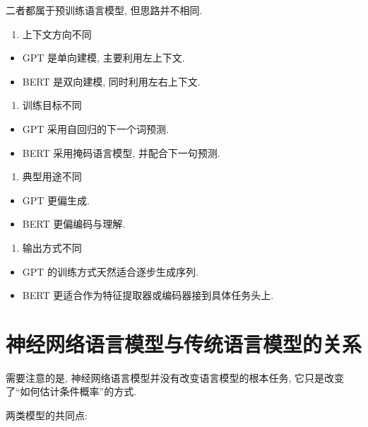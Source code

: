二者都属于预训练语言模型, 但思路并不相同.

\begin{enumerate}
\item[1.] 上下文方向不同
\end{enumerate}

\begin{itemize}
\item GPT 是单向建模, 主要利用左上下文.
\item BERT 是双向建模, 同时利用左右上下文.
\end{itemize}

\begin{enumerate}
\item[2.] 训练目标不同
\end{enumerate}

\begin{itemize}
\item GPT 采用自回归的下一个词预测.
\item BERT 采用掩码语言模型, 并配合下一句预测.
\end{itemize}

\begin{enumerate}
\item[3.] 典型用途不同
\end{enumerate}

\begin{itemize}
\item GPT 更偏生成.
\item BERT 更偏编码与理解.
\end{itemize}

\begin{enumerate}
\item[4.] 输出方式不同
\end{enumerate}

\begin{itemize}
\item GPT 的训练方式天然适合逐步生成序列.
\item BERT 更适合作为特征提取器或编码器接到具体任务头上.
\end{itemize}

\section{神经网络语言模型与传统语言模型的关系}


需要注意的是, 神经网络语言模型并没有改变语言模型的根本任务,
它只是改变了“如何估计条件概率”的方式.

两类模型的共同点:

